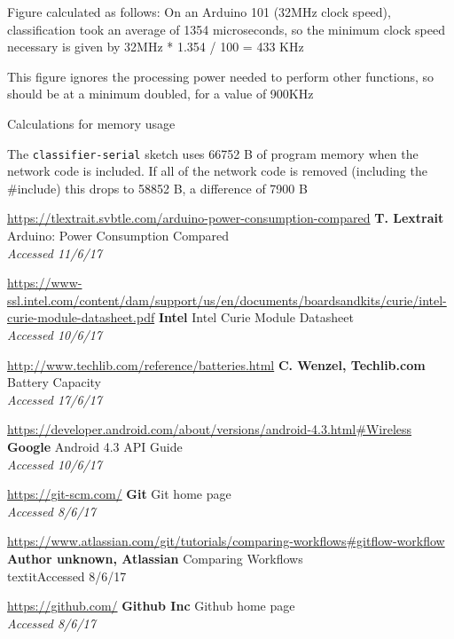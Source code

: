 \documentclass[a4paper]{article}
\begin{document}
\begin{thebibliography}{9}

Figure calculated as follows: On an Arduino 101 (32MHz clock speed), classification took an average of 1354 microseconds, so the minimum clock speed necessary is given by 32MHz * 1.354 / 100 = 433 KHz

This figure ignores the processing power needed to perform other functions, so should be at a minimum doubled, for a value of 900KHz

Calculations for memory usage

The \lstinline{classifier-serial} sketch uses 66752 B of program memory when the network code is included. If all of the network code is removed (including the \#include) this drops to 58852 B, a difference of 7900 B

\url{https://tlextrait.svbtle.com/arduino-power-consumption-compared}
\textbf{T. Lextrait}
Arduino: Power Consumption Compared
\\\textit{Accessed 11/6/17}

\url{https://www-ssl.intel.com/content/dam/support/us/en/documents/boardsandkits/curie/intel-curie-module-datasheet.pdf}
\textbf{Intel}
Intel Curie Module Datasheet
\\\textit{Accessed 10/6/17}

\url{http://www.techlib.com/reference/batteries.html}
\textbf{C. Wenzel, Techlib.com}
Battery Capacity
\\\textit{Accessed 17/6/17}

\url{https://developer.android.com/about/versions/android-4.3.html#Wireless}
\textbf{Google}
Android 4.3 API Guide
\\\textit{Accessed 10/6/17}


\url{https://git-scm.com/}
\textbf{Git }
Git home page
\\\textit{Accessed 8/6/17}

\url{https://www.atlassian.com/git/tutorials/comparing-workflows#gitflow-workflow}
\textbf{Author unknown, Atlassian}
Comparing Workflows
\\textit{Accessed 8/6/17}

\url{https://github.com/}
\textbf{Github Inc}
Github home page
\\\textit{Accessed 8/6/17}


\end{thebibliography}
\end{document}
